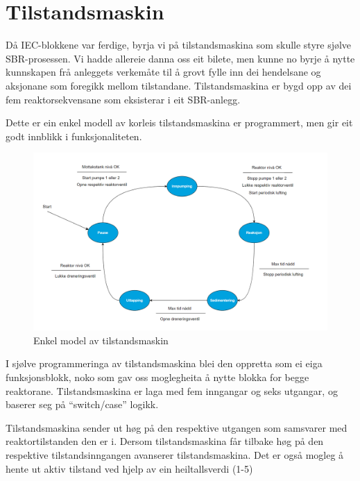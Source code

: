 \section{Tilstandsmaskin}
\thispagestyle{fancy}

Då \gls{IEC}-blokkene var ferdige, byrja vi på tilstandsmaskina som skulle styre sjølve \gls{SBR}-prosessen. 
Vi hadde allereie danna oss eit bilete, men kunne no byrje å nytte kunnskapen frå anleggets verkemåte
til å grovt fylle inn dei hendelsane og aksjonane som foregikk mellom tilstandane. 
Tilstandsmaskina er bygd opp av dei fem reaktorsekvensane som eksisterar i eit \gls{SBR}-anlegg.

Dette er ein enkel modell av korleis tilstandsmaskina er programmert, men gir eit godt innblikk i funksjonaliteten. \newline \newline \newline \newline \newline

\begin{figure}[htbp]
    \centering
    \includegraphics[width=1\textwidth]{Figurar/Simpel tilstandsmaskin.png}
    \caption{Enkel model av tilstandsmaskin}\label{fig:SimpelTilstandsmaskin}
\end{figure}


\newpage

I sjølve programmeringa av tilstandsmaskina blei den oppretta som ei eiga funksjonsblokk, noko som gav oss moglegheita å nytte blokka for begge reaktorane.
Tilstandsmaskina er laga med fem inngangar og seks utgangar, og baserer seg på ``switch/case'' logikk.

Tilstandsmaskina sender ut høg på den respektive utgangen som samsvarer med reaktortilstanden den er i. Dersom tilstandsmaskina får tilbake
høg på den respektive tilstandsinngangen avanserer tilstandsmaskina.
Det er også mogleg å hente ut aktiv tilstand ved hjelp av ein heiltallsverdi (1-5) \newline \newline \newline \newline


